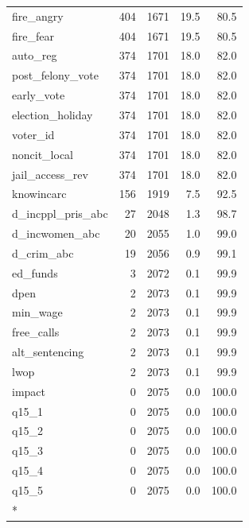 \begin{longtable}[t]{lrrrr}
fire\_angry & 404 & 1671 & 19.5 & 80.5\\
fire\_fear & 404 & 1671 & 19.5 & 80.5\\
\addlinespace
auto\_reg & 374 & 1701 & 18.0 & 82.0\\
post\_felony\_vote & 374 & 1701 & 18.0 & 82.0\\
early\_vote & 374 & 1701 & 18.0 & 82.0\\
election\_holiday & 374 & 1701 & 18.0 & 82.0\\
voter\_id & 374 & 1701 & 18.0 & 82.0\\
\addlinespace
noncit\_local & 374 & 1701 & 18.0 & 82.0\\
jail\_access\_rev & 374 & 1701 & 18.0 & 82.0\\
knowincarc & 156 & 1919 & 7.5 & 92.5\\
d\_incppl\_pris\_abc & 27 & 2048 & 1.3 & 98.7\\
d\_incwomen\_abc & 20 & 2055 & 1.0 & 99.0\\
\addlinespace
d\_crim\_abc & 19 & 2056 & 0.9 & 99.1\\
ed\_funds & 3 & 2072 & 0.1 & 99.9\\
dpen & 2 & 2073 & 0.1 & 99.9\\
min\_wage & 2 & 2073 & 0.1 & 99.9\\
free\_calls & 2 & 2073 & 0.1 & 99.9\\
\addlinespace
alt\_sentencing & 2 & 2073 & 0.1 & 99.9\\
lwop & 2 & 2073 & 0.1 & 99.9\\
impact & 0 & 2075 & 0.0 & 100.0\\
q15\_1 & 0 & 2075 & 0.0 & 100.0\\
q15\_2 & 0 & 2075 & 0.0 & 100.0\\
\addlinespace
q15\_3 & 0 & 2075 & 0.0 & 100.0\\
q15\_4 & 0 & 2075 & 0.0 & 100.0\\
q15\_5 & 0 & 2075 & 0.0 & 100.0\\*
\end{longtable}
\endgroup{}
